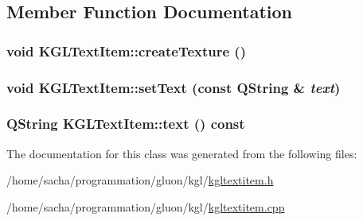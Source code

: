 \subsection{Member Function Documentation}
\hypertarget{class_k_g_l_text_item_330ab08d8e04a30433439ef60ce82537}{
\subsubsection[{createTexture}]{\setlength{\rightskip}{0pt plus 5cm}void KGLTextItem::createTexture ()}}
\label{class_k_g_l_text_item_330ab08d8e04a30433439ef60ce82537}


\hypertarget{class_k_g_l_text_item_7977d97cfd7480c0d5915803e259719c}{
\subsubsection[{setText}]{\setlength{\rightskip}{0pt plus 5cm}void KGLTextItem::setText (const QString \& {\em text})}}
\label{class_k_g_l_text_item_7977d97cfd7480c0d5915803e259719c}


\hypertarget{class_k_g_l_text_item_e747fea09561a8d87b464bd304eb8f9c}{
\subsubsection[{text}]{\setlength{\rightskip}{0pt plus 5cm}QString KGLTextItem::text () const}}
\label{class_k_g_l_text_item_e747fea09561a8d87b464bd304eb8f9c}




The documentation for this class was generated from the following files:\begin{CompactItemize}
\item 
/home/sacha/programmation/gluon/kgl/\hyperlink{kgltextitem_8h}{kgltextitem.h}\item 
/home/sacha/programmation/gluon/kgl/\hyperlink{kgltextitem_8cpp}{kgltextitem.cpp}\end{CompactItemize}
